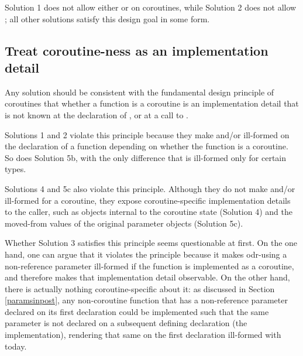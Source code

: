 Solution 1 does not allow either  or  on coroutines, while Solution 2 does not allow ; all other solutions satisfy this design goal in some form.

\subsection{Treat coroutine-ness as an implementation detail}
\label{goal_coro_principle}

Any solution should be consistent with the fundamental design principle of coroutines that whether a function  is a coroutine is an implementation detail that is not known at the declaration of , or at a call to .

Solutions 1 and 2 violate this principle because they make  and/or  ill-formed on the declaration of a function depending on whether the function is a coroutine. So does Solution 5b, with the only difference that  is ill-formed only for certain types. 

Solutions 4 and 5c also violate this principle. Although they do not make  and/or  ill-formed for a coroutine, they expose coroutine-specific implementation details to the caller, such as objects internal to the coroutine state (Solution 4) and the moved-from values of the original parameter objects (Solution 5c).

Whether Solution 3 satisfies this principle seems questionable at first. On the one hand, one can argue that it violates the principle because it makes odr-using a  non-reference parameter ill-formed if the function is implemented as a coroutine, and therefore makes that implementation detail observable. On the other hand, there is actually nothing coroutine-specific about it: as discussed in Section \ref{paramsinpost}, any non-coroutine function that has a non-reference parameter declared  on its first declaration could be implemented such that the same parameter is not declared  on a subsequent defining declaration (the implementation), rendering that same  on the first declaration ill-formed with \cite{P2900R8} today.

